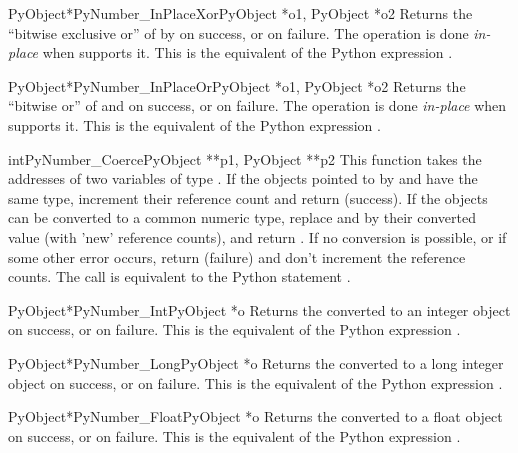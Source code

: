 \documentclass{manual}
\begin{document}
\begin{cfuncdesc}{PyObject*}{PyNumber_InPlaceXor}{PyObject *o1, PyObject *o2}
Returns the ``bitwise exclusive or'' of  by  on success, or
\NULL{} on failure.  The operation is done \emph{in-place} when 
supports it.  This is the equivalent of the Python expression .
\end{cfuncdesc}

\begin{cfuncdesc}{PyObject*}{PyNumber_InPlaceOr}{PyObject *o1, PyObject *o2}
Returns the ``bitwise or'' of  and  on success, or \NULL{}
on failure.  The operation is done \emph{in-place} when  supports
it.  This is the equivalent of the Python expression .
\end{cfuncdesc}

\begin{cfuncdesc}{int}{PyNumber_Coerce}{PyObject **p1, PyObject **p2}
This function takes the addresses of two variables of type
.  If the objects pointed to by  and
 have the same type, increment their reference count
and return  (success). If the objects can be converted to a
common numeric type, replace  and  by their
converted value (with 'new' reference counts), and return .
If no conversion is possible, or if some other error occurs, return
 (failure) and don't increment the reference counts.  The
call  is equivalent to the Python
statement .
\end{cfuncdesc}

\begin{cfuncdesc}{PyObject*}{PyNumber_Int}{PyObject *o}
Returns the  converted to an integer object on success, or
\NULL{} on failure.  This is the equivalent of the Python
expression .
\end{cfuncdesc}

\begin{cfuncdesc}{PyObject*}{PyNumber_Long}{PyObject *o}
Returns the  converted to a long integer object on success,
or \NULL{} on failure.  This is the equivalent of the Python
expression .
\end{cfuncdesc}

\begin{cfuncdesc}{PyObject*}{PyNumber_Float}{PyObject *o}
Returns the  converted to a float object on success, or
\NULL{} on failure.  This is the equivalent of the Python expression
.
\end{cfuncdesc}
\end{document}
